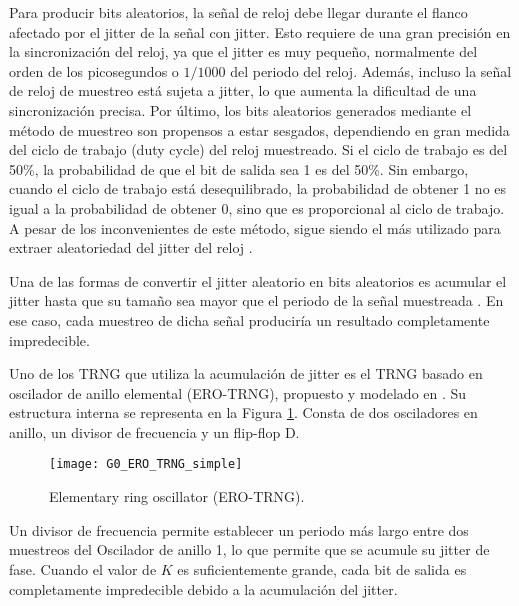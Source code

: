                 Para producir bits aleatorios, la señal de reloj debe llegar durante el flanco afectado por el jitter de la señal con jitter. Esto requiere de una gran precisión en la sincronización del reloj, ya que el jitter es muy pequeño, normalmente del orden de los picosegundos o $1/1000$ del periodo del reloj. Además, incluso la señal de reloj de muestreo está sujeta a jitter, lo que aumenta la dificultad de una sincronización precisa. Por último, los bits aleatorios generados mediante el método de muestreo son propensos a estar sesgados, dependiendo en gran medida del ciclo de trabajo (duty cycle) del reloj muestreado. Si el ciclo de trabajo es del 50\%, la probabilidad de que el bit de salida sea 1 es del 50\%. Sin embargo, cuando el ciclo de trabajo está desequilibrado, la probabilidad de obtener 1 no es igual a la probabilidad de obtener 0, sino que es proporcional al ciclo de trabajo. A pesar de los inconvenientes de este método, sigue siendo el más utilizado para extraer aleatoriedad del jitter del reloj \cite{Sunar2007,Baudet2010,Rozic2015,Cherkaoui2013, Zhang2018}.

                Una de las formas de convertir el jitter aleatorio en bits aleatorios es acumular el jitter hasta que su tamaño sea mayor que el periodo de la señal muestreada \cite{Baudet2010}. En ese caso, cada muestreo de dicha señal produciría un resultado completamente impredecible.

                Uno de los TRNG que utiliza la acumulación de jitter es el TRNG basado en oscilador de anillo elemental (ERO-TRNG), propuesto y modelado en \cite{Baudet2010}. Su estructura interna se representa en la Figura \ref{fig:G0_ERO_TRNG_simple}. Consta de dos osciladores en anillo, un divisor de frecuencia y un flip-flop D.

                \begin{figure}[hbtp]
                    \centering
                    \texttt{[image: G0\_ERO\_TRNG\_simple]}
                    \caption{Elementary ring oscillator (ERO-TRNG).}
                    \label{fig:G0_ERO_TRNG_simple}
                \end{figure}

                Un divisor de frecuencia permite establecer un periodo más largo entre dos muestreos del Oscilador de anillo 1, lo que permite que se acumule su jitter de fase. Cuando el valor de $K$ es suficientemente grande, cada bit de salida es completamente impredecible debido a la acumulación del jitter.

